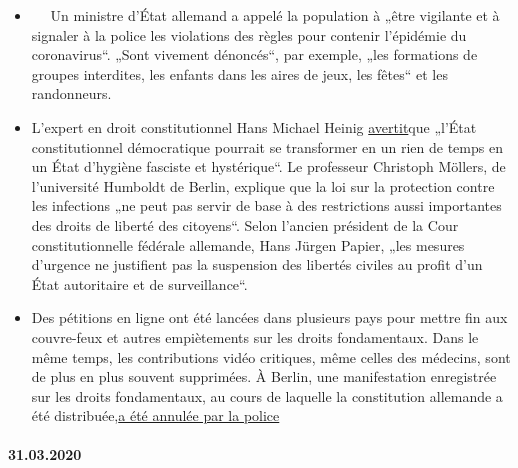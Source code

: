 \begin{itemize}
\tightlist
\item
  ~~ Un ministre d'État allemand a appelé la population à „être
  vigilante et à signaler à la police les violations des règles pour
  contenir l'épidémie du coronavirus``. „Sont vivement dénoncés``, par
  exemple, „les formations de groupes interdites, les enfants dans les
  aires de jeux, les fêtes`` et les randonneurs.
\item
  L'expert en droit constitutionnel Hans Michael Heinig
  \href{https://www.focus.de/politik/deutschland/corona-regelungen-der-regierung-medizin-darf-nicht-gefaehrlicher-sein-als-die-krankheit_id_11827625.html}{avertit}que
  „l'État constitutionnel démocratique pourrait se transformer en un
  rien de temps en un État d'hygiène fasciste et hystérique``. Le
  professeur Christoph Möllers, de l'université Humboldt de Berlin,
  explique que la loi sur la protection contre les infections „ne peut
  pas servir de base à des restrictions aussi importantes des droits de
  liberté des citoyens``. Selon l'ancien président de la Cour
  constitutionnelle fédérale allemande, Hans Jürgen Papier, „les mesures
  d'urgence ne justifient pas la suspension des libertés civiles au
  profit d'un État autoritaire et de surveillance``.
\item
  Des pétitions en ligne ont été lancées dans plusieurs pays pour mettre
  fin aux couvre-feux et autres empiètements sur les droits
  fondamentaux. Dans le même temps, les contributions vidéo critiques,
  même celles des médecins, sont de plus en plus souvent supprimées. À
  Berlin, une manifestation enregistrée sur les droits fondamentaux, au
  cours de laquelle la constitution allemande a été
  distribuée,\href{https://kenfm.de/berliner-corona-demo-strafbar-aufgeloest-aber-froehlich/}{a
  été annulée par la police}
\end{itemize}

\hypertarget{31032020}{%
\paragraph{31.03.2020}\label{31032020}}


